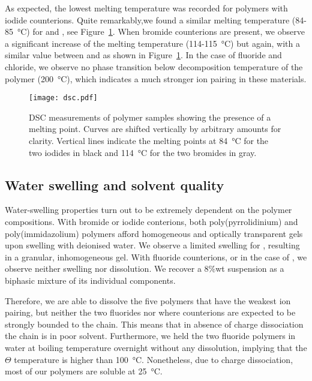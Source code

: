 \documentclass[journal=jacsat,manuscript=article]{achemso}
\begin{document}
As expected, the lowest melting temperature was recorded for polymers with iodide counterions. Quite remarkably,we found a similar melting temperature (84-\SI{85}{\celsius}) for  and , see Figure~\ref{fig:dsc}. When bromide counterions are present, we observe a significant increase of the melting temperature (114-\SI{115}{\celsius}) but again, with a similar value between  and  as shown in Figure~\ref{fig:dsc}. In the case of fluoride and chloride, we observe no phase transition below decomposition temperature of the polymer (\SI{200}{\celsius}), which indicates a much stronger ion pairing in these materials.

\begin{figure}
\texttt{[image: dsc.pdf]}
\caption{DSC measurements of polymer samples showing the presence of a melting point. Curves are shifted vertically by arbitrary amounts for clarity. Vertical lines indicate the melting points at \SI{84}{\celsius} for the two iodides in black and \SI{114}{\celsius} for the two bromides in gray.}
\label{fig:dsc}
\end{figure}

\subsection{Water swelling and solvent quality}
Water-swelling properties turn out to be extremely dependent on the polymer compositions. With bromide or iodide conterions, both poly(pyrrolidinium) and poly(immidazolium) polymers afford homogeneous and optically transparent gels upon swelling with deionised water. We observe a limited swelling for , resulting in a granular, inhomogeneous gel. With fluoride counterions, or in the case of , we observe neither swelling nor dissolution. We recover a 8\%wt suspension as a biphasic mixture of its individual components.

Therefore, we are able to dissolve the five polymers that have the weakest ion pairing, but neither the two fluorides nor  where counterions are expected to be strongly bounded to the chain. This means that in absence of charge dissociation the chain is in poor solvent. Furthermore, we held the two fluoride polymers in water at boiling temperature overnight without any dissolution, implying that the $\Theta$ temperature is higher than \SI{100}{\celsius}. Nonetheless, due to charge dissociation, most of our polymers are soluble at \SI{25}{\celsius}.
\end{document}
